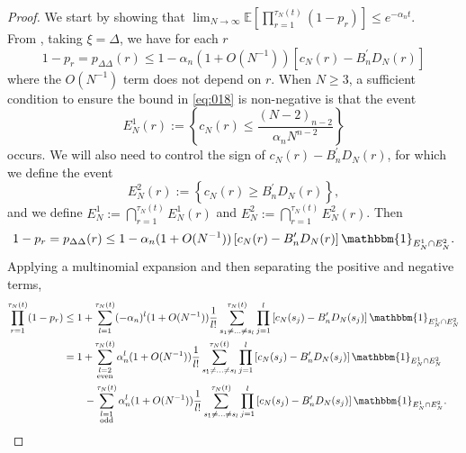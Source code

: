 \documentclass{article}
\newcommand{\E}{\mathbb{E}}
\newcommand{\1}[1]{\mathbbm{1}_{#1}}
\begin{document}
\begin{proof}
We start by showing that
$\lim_{N\to\infty}\E\left[ \prod_{r=1}^{\tau_N(t)} (1-p_r) \right] 
\leq e^{-\alpha_n t}$.\\
From \citet[Lemma 1 Case 1]{koskela2018}, taking $\xi=\Delta$, we have for each $r$
\begin{equation} \label{eq:018}
1-p_r
= p_{\Delta\Delta}(r) \leq 1 - \alpha_n (1+O(N^{-1})) 
        \left[ c_N(r) - B_n^\prime D_N(r) \right] 
\end{equation}
where the $O(N^{-1})$ term does not depend on $r$.
When $N \geq 3$, a sufficient condition to ensure the bound in \eqref{eq:018} is non-negative is that the event
\begin{equation}\label{eq:019b}
E_N^{1}(r) := \left\{ c_N(r) \leq \frac{(N-2)_{n-2}}{\alpha_n N^{n-2}} \right\} 
\end{equation}
occurs.
We will also need to control the sign of $c_N(r) - B_n^\prime D_N(r)$, for which we define the event
\begin{equation}\label{eq:defn_Eprime}
E_N^2(r) := \left\{ c_N(r) \geq B_n^\prime D_N(r) \right\} ,
\end{equation}
and we define $E_N^1 := \bigcap_{r=1}^{\tau_N(t)} E_N^1(r)$ and $E_N^2 := \bigcap_{r=1}^{\tau_N(t)} E_N^2(r)$.
Then
\begin{equation}
1-p_r
= p_{\Delta\Delta}(r) \leq 1 - \alpha_n (1+O(N^{-1})) 
        \left[ c_N(r) - B_n^\prime D_N(r) \right] \1{E_N^1 \cap E_N^2} .
\end{equation}
Applying a multinomial expansion and then separating the positive and negative terms,
\begin{align}
\prod_{r=1}^{\tau_N(t)} (1-p_r)
&\leq 1 + \sum_{l=1}^{\tau_N(t)} (- \alpha_n)^l (1+O(N^{-1})) 
        \frac{1}{l!} \sum_{s_1\neq\dots\neq s_l}^{\tau_N(t)}\prod_{j=1}^l
        \left[ c_N(s_j) - B_n^\prime D_N(s_j) \right] \1{E_N^1 \cap E_N^2} \notag\\
&= 1 + \sum_{\substack{l=2 \\ \text{even} }}^{\tau_N(t)} 
        \alpha_n^l (1+O(N^{-1})) \frac{1}{l!} 
        \sum_{s_1\neq\dots\neq s_l}^{\tau_N(t)}\prod_{j=1}^l
        \left[ c_N(s_j) - B_n^\prime D_N(s_j) \right] \1{E_N^1 \cap E_N^2} \notag\\
    &\qquad- \sum_{\substack{l=1 \\ \text{odd} }}^{\tau_N(t)} 
        \alpha_n^l (1+O(N^{-1})) \frac{1}{l!} 
        \sum_{s_1\neq\dots\neq s_l}^{\tau_N(t)}\prod_{j=1}^l
        \left[ c_N(s_j) - B_n^\prime D_N(s_j) \right] \1{E_N^1 \cap E_N^2} .

\end{align}
\end{proof}
\end{document}

